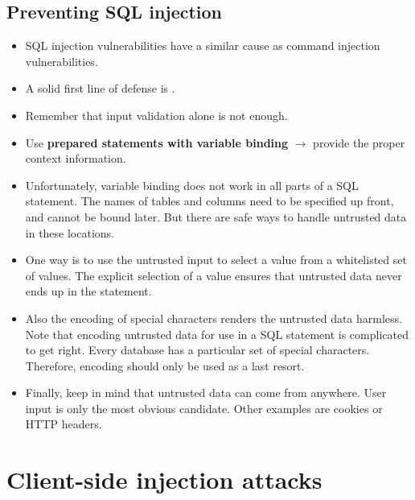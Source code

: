 \documentclass[../main.tex]{subfiles}
\begin{document}
\subsection{Preventing SQL injection}
\begin{itemize}
\item SQL injection vulnerabilities have a similar cause as command injection vulnerabilities.
\item A solid first line of defense is .
\item Remember that input validation alone is not enough.
\item Use \textbf{prepared statements with variable binding} $\rightarrow$ provide the proper context information.
\item Unfortunately, variable binding does not work in all parts of a SQL statement. The names of tables and columns need to be specified up front, and cannot be bound later. But there are safe ways to handle untrusted data in these locations.
\item One way is to use the untrusted input to select a value from a whitelisted set of values. The explicit selection of a value ensures that untrusted data never ends up in the statement.
\item Also the encoding of special characters renders the untrusted data harmless. Note that encoding untrusted data for use in a SQL statement is complicated to get right. Every database has a particular set of special characters. Therefore, encoding should only be used as a last resort.
\item Finally, keep in mind that untrusted data can come from anywhere. User input is only the most obvious candidate. Other examples are cookies or HTTP headers.
\end{itemize}

\section{Client-side injection attacks}
\end{document}

